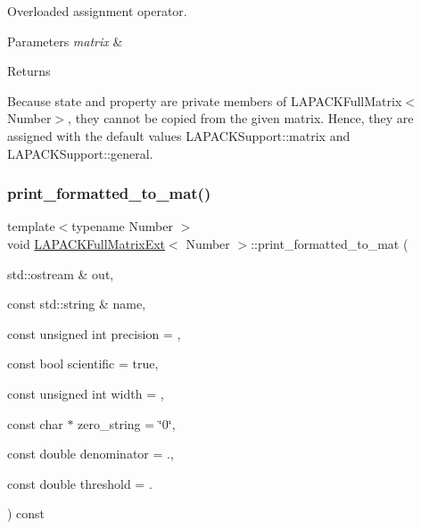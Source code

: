 Overloaded assignment operator. 
\begin{DoxyParams}{Parameters}
{\em matrix} & \\
\hline
\end{DoxyParams}
\begin{DoxyReturn}{Returns}

\end{DoxyReturn}
Because {\ttfamily state} and {\ttfamily property} are private members of {\ttfamily L\+A\+P\+A\+C\+K\+Full\+Matrix$<$\+Number$>$}, they cannot be copied from the given {\ttfamily matrix}. Hence, they are assigned with the default values {\ttfamily L\+A\+P\+A\+C\+K\+Support\+::matrix} and {\ttfamily L\+A\+P\+A\+C\+K\+Support\+::general}.\mbox{\label{classLAPACKFullMatrixExt_aae17980cb1bd3802fdc4a629040b6ed7}} 
\subsubsection{\texorpdfstring{print\+\_\+formatted\+\_\+to\+\_\+mat()}{print\_formatted\_to\_mat()}}
{\footnotesize\ttfamily template$<$typename Number $>$ \\
void \hyperlink{classLAPACKFullMatrixExt}{L\+A\+P\+A\+C\+K\+Full\+Matrix\+Ext}$<$ Number $>$\+::print\+\_\+formatted\+\_\+to\+\_\+mat (\begin{DoxyParamCaption}\item[{std\+::ostream \&}]{out,  }\item[{const std\+::string \&}]{name,  }\item[{const unsigned int}]{precision = {},  }\item[{const bool}]{scientific = {\ttfamily true},  }\item[{const unsigned int}]{width = {},  }\item[{const char $\ast$}]{zero\+\_\+string = {\ttfamily \char`\"{}0\char`\"{}},  }\item[{const double}]{denominator = {.},  }\item[{const double}]{threshold = {.} }\end{DoxyParamCaption}) const}

